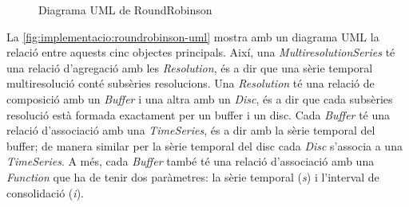 \begin{figure}[tp]
  \centering


  \caption{Diagrama UML de RoundRobinson}
  \label{fig:implementacio:roundrobinson-uml}
\end{figure}



La \autoref{fig:implementacio:roundrobinson-uml} mostra amb un
diagrama UML la relació entre aquests cinc objectes principals. Així,
una \emph{MultiresolutionSeries} té una relació d'agregació amb les
\emph{Resolution}, és a dir que una sèrie temporal multiresolució
conté subsèries resolucions.  Una \emph{Resolution} té una relació de
composició amb un \emph{Buffer} i una altra amb un \emph{Disc}, és a
dir que cada subsèries resolució està formada exactament per un buffer
i un disc. Cada \emph{Buffer} té una relació d'associació amb una
\emph{TimeSeries}, és a dir amb la sèrie temporal del buffer; de
manera similar per la sèrie temporal del disc cada \emph{Disc}
s'associa a una \emph{TimeSeries}. A més, cada \emph{Buffer} també té
una relació d'associació amb una \emph{Function} que ha de tenir dos
paràmetres: la sèrie temporal (\emph{s}) i l'interval de consolidació
(\emph{i}).




